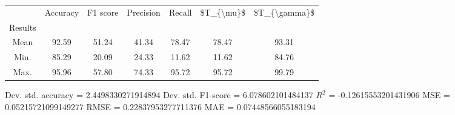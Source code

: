\begin{tabular}{|c|c|c|c|c|c|c|}
\toprule
{} &  Accuracy &  F1 score &  Precision &  Recall &  \$T\_\{\textbackslash mu\}\$ &  \$T\_\{\textbackslash gamma\}\$ \\
Results &           &           &            &         &            &               \\
\hline
Mean    &     92.59 &     51.24 &      41.34 &   78.47 &      78.47 &         93.31 \\
Min.    &     85.29 &     20.09 &      24.33 &   11.62 &      11.62 &         84.76 \\
Max.    &     95.96 &     57.80 &      74.33 &   95.72 &      95.72 &         99.79 \\
\bottomrule
\end{tabular}

 Dev. std. accuracy = 2.4498330271914894
 Dev. std. F1-score = 6.078602101484137
 $R^2$ = -0.12615553201431906
 MSE = 0.05215721099149277
 RMSE = 0.22837953277711376
 MAE = 0.07448566055183194